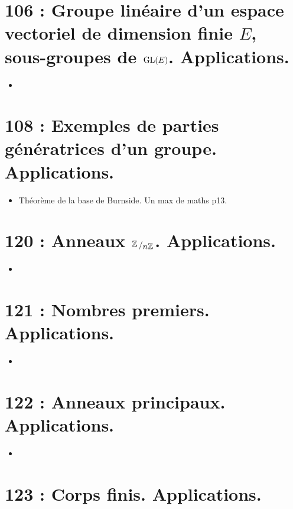 \documentclass[a4paper,10pt,oneside,twocolumn,landscape]{book}
\begin{document}
\section{106 : Groupe linéaire d’un espace vectoriel de dimension finie $E$, sous-groupes de $\textup{GL}(E)$. Applications.}
\begin{itemize}
	\item
\end{itemize}


\section{108 :  Exemples de parties génératrices d’un groupe. Applications.}

\begin{itemize}
	\item Théorème de la base de Burnside. Un max de maths p13.
\end{itemize}


\section{120 : Anneaux $\bigslant{\ZZ}{n\ZZ}$. Applications.}

\begin{itemize}
	\item 
\end{itemize}

\section{121 : Nombres premiers. Applications.}

\begin{itemize}
	\item 
\end{itemize}

\section{122 : Anneaux principaux. Applications.}

\begin{itemize}
	\item 
\end{itemize}

\section{123 : Corps finis. Applications.}
\end{document}
